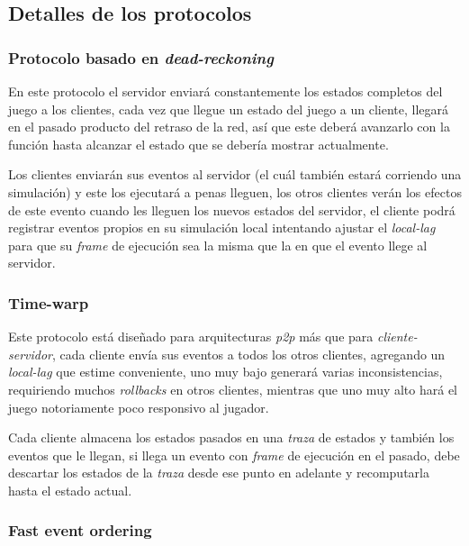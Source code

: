 \subsection{Detalles de los protocolos}


\subsubsection{Protocolo basado en \emph{dead-reckoning}}

En este protocolo el servidor enviará constantemente los estados completos del juego a los clientes, cada vez que llegue un estado del juego a un cliente, llegará en el pasado producto del retraso de la red, así que este deberá avanzarlo con la función hasta alcanzar el estado que se debería mostrar actualmente.

Los clientes enviarán sus eventos al servidor (el cuál también estará corriendo una simulación) y este los ejecutará a penas lleguen, los otros clientes verán los efectos de este evento cuando les lleguen los nuevos estados del servidor, %
el cliente podrá registrar eventos propios en su simulación local intentando ajustar el \emph{local-lag} para que su \emph{frame} de ejecución sea la misma que la en que el evento llege al servidor.

\subsubsection{Time-warp}

Este protocolo está diseñado para arquitecturas \emph{p2p} más que para \emph{cliente-servidor}, cada cliente envía sus eventos a todos los otros clientes, agregando un \emph{local-lag} que estime conveniente, uno muy bajo generará varias inconsistencias, requiriendo muchos \emph{rollbacks} en otros clientes, mientras que uno muy alto hará el juego notoriamente poco responsivo al jugador.

Cada cliente almacena los estados pasados en una \emph{traza} de estados y también los eventos que le llegan, si llega un evento con \emph{frame} de ejecución en el pasado, debe descartar los estados de la \emph{traza} desde ese punto en adelante y recomputarla hasta el estado actual.

\subsubsection{Fast event ordering}


